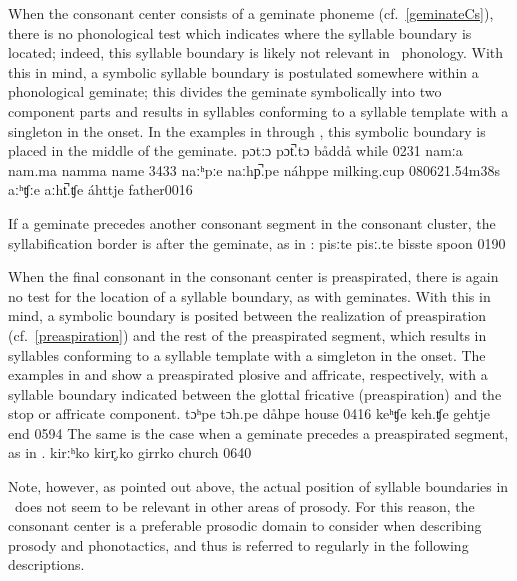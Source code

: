 When the consonant center consists of a geminate phoneme (cf.~\SEC\ref{geminateCs}), there is no phonological test which indicates where the syllable boundary is located; 
indeed, this syllable boundary is likely not relevant in \PS\ phonology. With this in mind, a symbolic syllable boundary is postulated somewhere within a phonological geminate; this divides the geminate symbolically into two component parts and results in syllables conforming to a syllable template with a singleton in the onset. In the examples in  through , this symbolic boundary is placed in the middle of the geminate.
	{pɔtːɔ}	{pɔt̚.tɔ}		{båddå}	{while\BS{}}		{0231}
	{namːa}	{nam.ma}		{namma}	{name\BS{}}		{3433}
	{naːʰpːe}	{naːhp̚.pe}	{náhppe}	{milking.cup\BS{}}	{080621}{.54m38s}
		{aːʰʧːe}	{aːht̚.ʧe}	{áhttje}	{father\BS{}}{0016}

If a geminate precedes another consonant segment in the consonant cluster, the syllabification border is after the geminate, as in :
	{pisːte}	{pisː.te}		{bisste}	{spoon\BS{}}		{0190}

When the final consonant in the consonant center is preaspirated, there is again no test for the location of a syllable boundary, as with geminates. With this in mind, a symbolic boundary is posited between the realization of preaspiration (cf.~\SEC\ref{preaspiration}) and the rest of the preaspirated segment, which results in syllables conforming to a syllable template with a simgleton in the onset. The examples in  and  show a preaspirated plosive and affricate, respectively, with a syllable boundary indicated between the glottal fricative (preaspiration) and the stop or affricate component.
	{tɔʰpe}	{tɔh.pe}		{dåhpe}	{house\BS{}}		{0416}
		{keʰʧe}	{keh.ʧe}		{gehtje}	{end\BS{}}		{0594}
The same is the case when a geminate precedes a preaspirated segment, as in . %
	{kirːʰko}	{kirr̥.ko}		{girrko}	{church\BS{}}		{0640}

Note, however, as pointed out above, the actual position of syllable boundaries in \PS\ does not seem to be relevant in other areas of prosody. 
For this reason, the consonant center is a preferable prosodic domain to consider when describing prosody and phonotactics, and thus is referred to regularly in the following descriptions.



